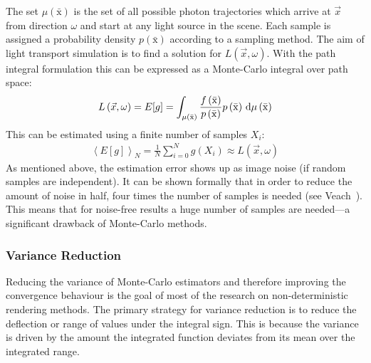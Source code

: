The set $\mu\left(\bar{\mathrm{x}}\right)$ is the set of all possible photon trajectories which arrive at $\vec{x}$ from direction $\omega$ and start at any light source in the scene. Each sample is assigned a probability density $p\left(\bar{\mathrm{x}}\right)$ according to a sampling method. The aim of light transport simulation is to find a solution for $L(\vec{x}, \omega)$. With the path integral formulation this can be expressed as a Monte-Carlo integral over path space:
\begin{align}
L\left(\vec{x},\omega\right) = E[g] = \int_{\mu\left(\bar{\mathrm{x}}\right)} \frac{f\left(\bar{\mathrm{x}}\right)}{p\left(\bar{\mathrm{x}}\right)}p\left(\bar{\mathrm{x}}\right)
\,\mathrm{d}\mu\left(\bar{\mathrm{x}}\right)
\end{align}
This can be estimated using a finite number of samples $X_i$:
\begin{align}
\left<E[g]\right>_N = 
\frac{1}{N}\sum_{i=0}^{N}
g\left(X_i\right)
\approx
L\left(\vec{x},\omega\right)
\end{align}
As mentioned above, the estimation error shows up as image noise (if random samples are independent). It can be shown formally that in order to reduce the amount of noise in half, four times the number of samples is needed (see Veach~\cite{VeachThesis97}). This means that for noise-free results a huge number of samples are needed---a significant drawback of Monte-Carlo methods.

\subsubsection*{Variance Reduction}

Reducing the variance of Monte-Carlo estimators and therefore improving the convergence behaviour is the goal of most of the research on non-deterministic rendering methods. The primary strategy for variance reduction is to reduce the deflection or range of values under the integral sign. This is because the variance is driven by the amount the integrated function deviates from its mean over the integrated range.

